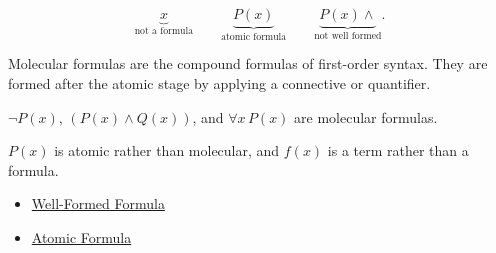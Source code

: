 \begin{remark*}
\[
\underbrace{x}_{\text{not a formula}}
\qquad
\underbrace{P(x)}_{\text{atomic formula}}
\qquad
\underbrace{P(x)\land}_{\text{not well formed}}.
\]
\end{remark*}

\begin{remark*}[Interpretation]
Molecular formulas are the compound formulas of first-order syntax. They are
formed after the atomic stage by applying a connective or quantifier.
\end{remark*}

\begin{remark*}[Examples]
\(\neg P(x)\), \((P(x)\land Q(x))\), and \(\forall x\,P(x)\) are molecular
formulas.
\end{remark*}

\begin{remark*}
\(P(x)\) is atomic rather than molecular, and \(f(x)\) is a term rather than a
formula.
\end{remark*}

\begin{dependencies}
\begin{itemize}
  \item \hyperref[def:wff-pred]{Well-Formed Formula}
  \item \hyperref[def:atomic-formula]{Atomic Formula}
\end{itemize}
\end{dependencies}

